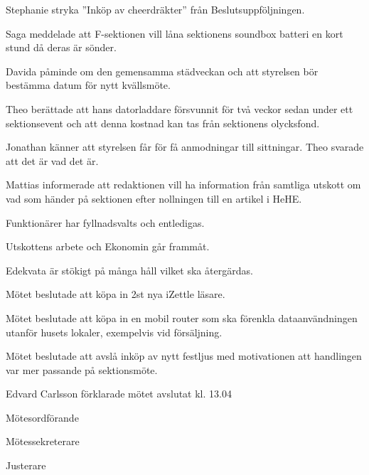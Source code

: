 \documentclass[10pt]{article}
\def\mo{Edvard Carlsson}
\def\ms{Mattias Lundström}
\def\ji{Jakob Pettersson}
\begin{document}
\begin{paragrafer}
Stephanie \ypa stryka ''Inköp av cheerdräkter'' från Beslutsuppföljningen.

\Mbaby


Saga meddelade att F-sektionen vill låna sektionens soundbox batteri en kort stund då deras är sönder. 

Davida påminde om den gemensamma städveckan och att styrelsen bör bestämma datum för nytt kvällsmöte.

Theo berättade att hans datorladdare försvunnit för två veckor sedan under ett sektionsevent och att denna kostnad kan tas från sektionens olycksfond. 

Jonathan känner att styrelsen får för få anmodningar till sittningar. Theo svarade att det är vad det är. 

Mattias informerade att redaktionen vill ha information från samtliga utskott om vad som händer på sektionen efter nollningen till en artikel i HeHE.

Funktionärer har fyllnadsvalts och entledigas.

Utskottens arbete och Ekonomin går frammåt. 

Edekvata är stökigt på många håll vilket ska återgärdas. 

Mötet beslutade att köpa in 2st nya iZettle läsare.

Mötet beslutade att köpa in en mobil router som ska förenkla dataanvändningen utanför husets lokaler, exempelvis vid försäljning. 

Mötet beslutade att avslå inköp av nytt festljus med motivationen att handlingen var mer passande på sektionsmöte.    

{\mo} förklarade mötet avslutat kl. 13.04
\end{paragrafer}

\hidesignfoot
\begin{signatures}{3}
\signature{\mo}{Mötesordförande}
\signature{\ms}{Mötessekreterare}
\signature{\ji}{Justerare}
\end{signatures}
\end{document}

